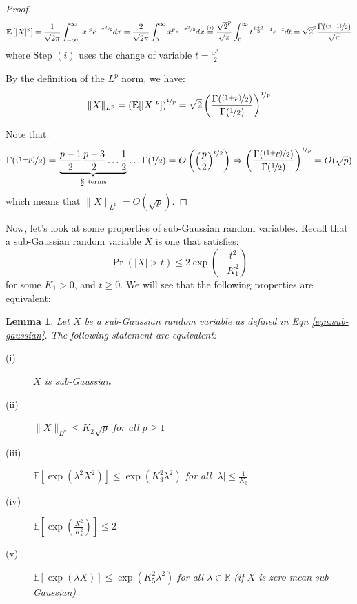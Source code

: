 \documentclass{article}
\newtheorem{lemma}{Lemma}[subsection]
\theoremstyle{remark}
\newcommand{\real}{\mathbb{R}}
\newcommand{\Exp}{\mathbb{E}}
\begin{document}
\begin{proof}
\begin{equation*}
\Exp\left[|X|^{p}\right] = \frac{1}{\sqrt{2\pi}}\int_{-\infty}^{\infty} |x|^{p}e^{-\nicefrac{x^{2}}{2}} dx = \frac{2}{\sqrt{2\pi}}\int_{0}^{\infty} x^{p}e^{-\nicefrac{x^{2}}{2}} dx \overset{(i)}= \frac{\sqrt{2}^{p}}{\sqrt{\pi}}\int_{0}^{\infty} t^{\frac{p+1}{2} - 1} e^{-t} dt = \sqrt{2}^{p}\frac{\Gamma(\nicefrac{(p + 1)}{2})}{\sqrt{\pi}}
\end{equation*}
where Step \((i)\) uses the change of variable \(t = \frac{x^{2}}{2}\)

By the definition of the \(L^{p}\) norm, we have:
\begin{equation*}
\|X\|_{L^{p}} = \left(\Exp[|X|^{p}]\right)^{\nicefrac{1}{p}} = \sqrt{2}\left(\frac{\Gamma(\nicefrac{(1 + p)}{2})}{\Gamma(\nicefrac{1}{2})}\right)^{\nicefrac{1}{p}}
\end{equation*}

Note that:
\begin{equation*}
\Gamma(\nicefrac{(1 + p)}{2}) = \underbrace{\frac{p - 1}{2}\frac{p - 3}{2}\ldots\frac{1}{2}}_{\frac{p}{2} \text{ terms}}\ldots\Gamma(\nicefrac{1}{2}) = O\left(\left(\frac{p}{2}\right)^{\nicefrac{p}{2}}\right) \Rightarrow \left(\frac{\Gamma(\nicefrac{(1 + p)}{2})}{\Gamma(\nicefrac{1}{2})}\right)^{\nicefrac{1}{p}} = O(\sqrt{p})
\end{equation*}
which means that \(\|X\|_{L^{p}} = O(\sqrt{p})\).
\end{proof}

Now, let's look at some properties of sub-Gaussian random variables. Recall that a sub-Gaussian random variable \(X\) is one that satisfies:
\begin{equation}
\label{eqn:sub-gaussian}
\Pr(|X| > t) \leq 2\exp\left(-\frac{t^{2}}{K_{1}^{2}}\right)
\end{equation}
for some \(K_{1} > 0\), and \(t \geq 0\). We will see that the following properties are equivalent:

\begin{lemma}
\label{lem:sub-gauss-equiv}
Let \(X\) be a sub-Gaussian random variable as defined in Eqn \ref{eqn:sub-gaussian}. The following statement are equivalent:
\begin{description}
\item [(i)] \(X\) is sub-Gaussian
\item [(ii)] \(\|X\|_{L^{p}} \leq K_{2}\sqrt{p}\) for all \(p \geq 1\)
\item [(iii)] \(\Exp[\exp(\lambda^{2}X^{2})] \leq \exp(K_{3}^{2}\lambda^{2})\) for all \(|\lambda| \leq \frac{1}{K_{3}}\)
\item [(iv)] \(\Exp\left[\exp\left(\frac{X^{2}}{K_{4}^{2}}\right)\right] \leq 2\)
\item [(v)] \(\Exp\left[\exp(\lambda X)\right] \leq \exp(K_{5}^{2}\lambda^{2})\) for all \(\lambda \in \real\) (if \(X\) is zero mean sub-Gaussian)
\end{description}
\end{lemma}
\end{document}
